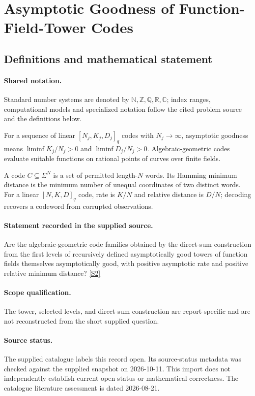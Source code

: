 \documentclass[11pt]{article}
\newcommand{\sref}[2]{\hyperlink{source:#1:#2}{[S#2]}}
\begin{document}
\section{Asymptotic Goodness of Function-Field-Tower Codes}\label{statement}

\subsection{Definitions and mathematical statement}

\paragraph{Shared notation.}Standard number systems are denoted by $\mathbb N,\mathbb Z,\mathbb Q,\mathbb R,\mathbb C$; index ranges, computational models and specialized notation follow the cited problem source and the definitions below.


For a sequence of linear $[N_j,K_j,D_j]_q$ codes with $N_j\to\infty$, asymptotic goodness means $\liminf K_j/N_j>0$ and $\liminf D_j/N_j>0$. Algebraic-geometric codes evaluate suitable functions on rational points of curves over finite fields.

A code $C\subseteq\Sigma^N$ is a set of permitted length-$N$ words. Its Hamming minimum distance is the minimum number of unequal coordinates of two distinct words. For a linear $[N,K,D]_q$ code, rate is $K/N$ and relative distance is $D/N$; decoding recovers a codeword from corrupted observations.
\paragraph{Statement recorded in the supplied source.}
Are the algebraic-geometric code families obtained by the direct-sum construction from the first levels of recursively defined asymptotically good towers of function fields themselves asymptotically good, with positive asymptotic rate and positive relative minimum distance? \sref{statement}{2}
\paragraph{Scope qualification.}
The tower, selected levels, and direct-sum construction are report-specific and are not reconstructed from the short supplied question.
\paragraph{Source status.}
The supplied catalogue labels this record open. Its source-status metadata was checked against the supplied snapshot on 2026-10-11. This import does not independently establish current open status or mathematical correctness. The catalogue literature assessment is dated 2026-08-21.
\end{document}
